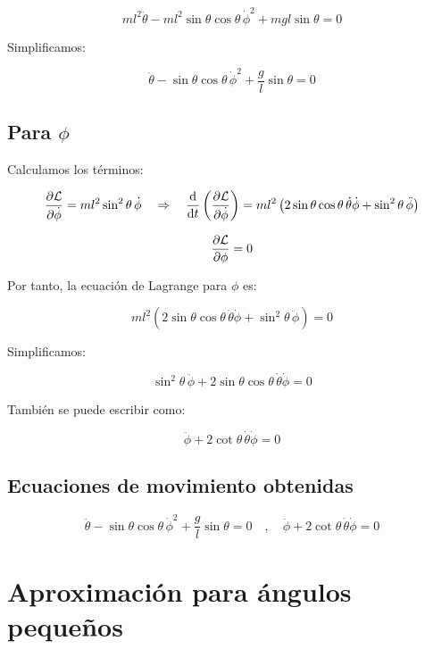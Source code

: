 \documentclass[12pt]{article}
\begin{document}
\[
m l^2 \ddot{\theta} - m l^2 \sin\theta \cos\theta \, \dot{\phi}^2 + m g l \sin\theta = 0
\]

Simplificamos:

\begin{equation}
\boxed{
\ddot{\theta} - \sin\theta \cos\theta \, \dot{\phi}^2 + \frac{g}{l} \sin\theta = 0
}
\label{Eq7}
\end{equation}

\subsection*{Para \( \phi \)}

Calculamos los términos:

\[
\pdv{\mathcal{L}}{\dot{\phi}} = m l^2 \sin^2\theta \, \dot{\phi}
\quad \Rightarrow \quad
\dv{t} \left( \pdv{\mathcal{L}}{\dot{\phi}} \right)
= m l^2 \left( 2 \sin\theta \cos\theta \, \dot{\theta} \dot{\phi} + \sin^2\theta \, \ddot{\phi} \right)
\]

\[
\pdv{\mathcal{L}}{\phi} = 0
\]

Por tanto, la ecuación de Lagrange para \( \phi \) es:

\[
m l^2 \left( 2 \sin\theta \cos\theta \, \dot{\theta} \dot{\phi} + \sin^2\theta \, \ddot{\phi} \right) = 0
\]

Simplificamos:

\begin{equation}
\boxed{
\sin^2\theta \, \ddot{\phi} + 2 \sin\theta \cos\theta \, \dot{\theta} \dot{\phi} = 0
}
\label{Eq8}
\end{equation}

También se puede escribir como:

\begin{equation}
\boxed{
\ddot{\phi} + 2 \cot\theta \, \dot{\theta} \dot{\phi} = 0
}
\label{Eq9}
\end{equation}

\subsection*{Ecuaciones de movimiento obtenidas}

\begin{equation}
\boxed{
\ddot{\theta} - \sin\theta \cos\theta \, \dot{\phi}^2 + \frac{g}{l} \sin\theta = 0
\quad , \quad
\ddot{\phi} + 2 \cot\theta \, \dot{\theta} \dot{\phi} = 0
}
\label{Eq10}
\end{equation}

\section*{Aproximación para ángulos pequeños}
\end{document}
